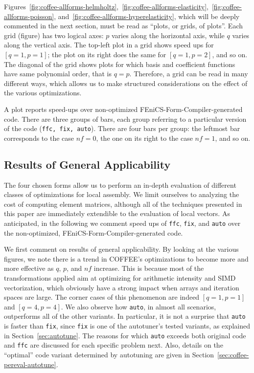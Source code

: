 Figures~\ref{fig:coffee-allforms-helmholtz},~\ref{fig:coffee-allforms-elasticity},~\ref{fig:coffee-allforms-poisson}, and~\ref{fig:coffee-allforms-hyperelasticity}, which will be deeply commented in the next section, must be read as ``plots, or grids, of plots''. Each grid (figure) has two logical axes: $p$ varies along the horizontal axis, while $q$ varies along the vertical axis. The top-left plot in a grid shows speed ups for $[q=1, p=1]$; the plot on its right does the same for $[q=1, p=2]$, and so on. The diagonal of the grid shows plots for which basis and coefficient functions have same polynomial order, that is $q=p$. Therefore, a grid can be read in many different ways, which allows us to make structured considerations on the effect of the various optimizations. 

A plot reports speed-ups over non-optimized FEniCS-Form-Compiler-generated code. There are three groups of bars, each group referring to a particular version of the code (\texttt{ffc, fix, auto}). There are four bars per group: the leftmost bar corresponds to the case $nf = 0$, the one on its right to the case $nf = 1$, and so on. 

\subsection{Results of General Applicability}
\label{sec:coffee-allforms-perf}
The four chosen forms allow us to perform an in-depth evaluation of different classes of optimizations for local assembly. We limit ourselves to analyzing the cost of computing element matrices, although all of the techniques presented in this paper are immediately extendible to the evaluation of local vectors. As anticipated, in the following we comment speed ups of \texttt{ffc}, \texttt{fix}, and \texttt{auto} over the non-optimized, FEniCS-Form-Compiler-generated code. 

We first comment on results of general applicability. By looking at the various figures, we note there is a trend in COFFEE's optimizations to become more and more effective as $q$, $p$, and $nf$ increase. This is because most of the transformations applied aim at optimizing for arithmetic intensity and SIMD vectorization, which obviously have a strong impact when arrays and iteration spaces are large. The corner cases of this phenomenon are indeed $[q=1, p=1]$ and $[q=4, p=4]$. We also observe how \texttt{auto}, in almost all scenarios, outperforms all of the other variants. In particular, it is not a surprise that \texttt{auto} is faster than \texttt{fix}, since \texttt{fix} is one of the autotuner's tested variants, as explained in Section~\ref{sec:autotune}. The reasons for which \texttt{auto} exceeds both original code and \texttt{ffc} are discussed for each specific problem next. Also, details on the ``optimal'' code variant determined by autotuning are given in Section~\ref{sec:coffee-pereval-autotune}.

